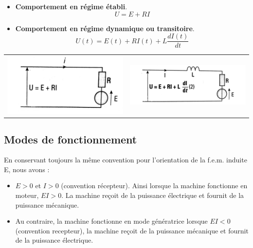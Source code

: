 \documentclass{article}
\begin{document}
\begin{itemize}
    \item \textbf{Comportement en régime établi}. 
    \begin{equation}
        U = E + RI
    \end{equation}
    \item \textbf{Comportement en régime dynamique ou transitoire}. 
    \begin{equation}
        U(t) = E(t) + RI(t) + L \frac{dI (t)}{dt}
    \end{equation}
\end{itemize}


\begin{tabular}{cc}
   \includegraphics[scale=0.11]{etabliMCC.jpg} &
   \includegraphics[scale=0.11]{dynamMCC.jpg} \\
\end{tabular}


\subsection{Modes de fonctionnement}

En conservant toujours la même convention pour l'orientation de la f.e.m. induite E, nous avons :

\begin{itemize}
    \item $E > 0$ et $I>0$ (convention récepteur). Ainsi lorsque la machine fonctionne en moteur, $EI>0$. La machine reçoit de la puissance électrique et fournit de la puissance mécanique.
    \item Au contraire, la machine fonctionne en mode génératrice lorsque $EI<0$ (convention recepteur), la machine reçoit de la puissance mécanique et fournit de la puissance électrique.
\end{itemize}
\end{document}
